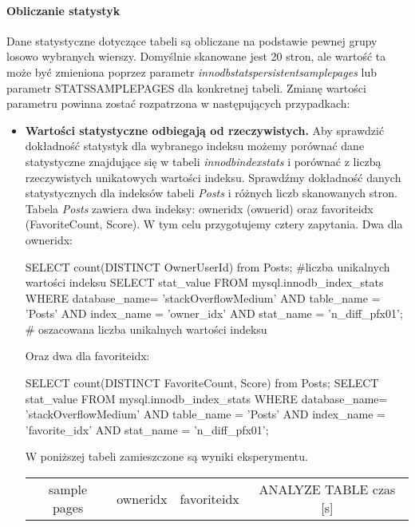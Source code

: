 \paragraph{Obliczanie statystyk}
Dane statystyczne dotyczące tabeli są obliczane na podstawie pewnej grupy losowo wybranych wierszy. Domyślnie skanowane jest 20 stron, ale wartość ta może być zmieniona poprzez parametr \textit{innodb\textunderscore stats\textunderscore persistent\textunderscore sample\textunderscore pages} lub parametr STATS\textunderscore SAMPLE\textunderscore PAGES dla konkretnej tabeli. Zmianę wartości parametru powinna zostać rozpatrzona w następujących przypadkach:
\begin{itemize}
	\item \textbf{Wartości statystyczne odbiegają od rzeczywistych.} \linebreak
	Aby sprawdzić dokładność statystyk dla wybranego indeksu możemy porównać dane statystyczne znajdujące się w tabeli \textit{innodb\textunderscore index\textunderscore stats} i porównać z liczbą rzeczywistych unikatowych wartości indeksu. Sprawdźmy dokładność danych statystycznych dla indeksów tabeli \textit{Posts} i różnych liczb skanowanych stron. Tabela \textit{Posts} zawiera dwa indeksy: owner\textunderscore idx (owner\textunderscore id) oraz favorite\textunderscore idx (FavoriteCount, Score).
	W tym celu przygotujemy cztery zapytania.
	Dwa dla owner\textunderscore idx:
	\begin{spverbatim}
		SELECT count(DISTINCT OwnerUserId) from Posts; #liczba unikalnych wartości indeksu
		SELECT stat_value FROM mysql.innodb_index_stats WHERE database_name=
		'stackOverflowMedium' AND table_name = 'Posts' AND index_name = 'owner_idx' AND 
		stat_name = 'n_diff_pfx01'; # oszacowana liczba unikalnych wartości indeksu
	\end{spverbatim}
	Oraz dwa dla favorite\textunderscore idx:
	\begin{spverbatim}
		SELECT count(DISTINCT FavoriteCount, Score) from Posts;
		SELECT stat_value FROM mysql.innodb_index_stats WHERE database_name=
		'stackOverflowMedium'
		AND table_name = 'Posts' AND index_name = 'favorite_idx' AND 
		stat_name = 'n_diff_pfx01';
	\end{spverbatim}
	W poniższej tabeli zamieszczone są wyniki eksperymentu.
	\begin{center}
		\begin{tabular}{ |c|c|c|c| } 
			\hline
			sample pages & owner\textuderscore idx & favorite\textunderscore idx & ANALYZE TABLE czas [s]\\ 

\end{tabular}
\end{center}
\end{itemize}
